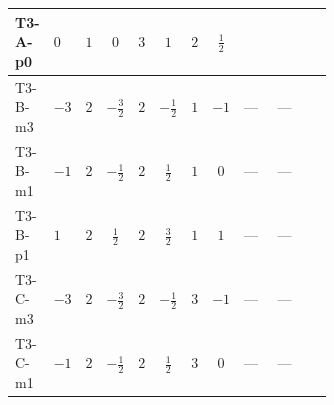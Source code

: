 \documentclass[8pt]{article}
\begin{document}
\begin{landscape}
\begin{longtable}{@{}llcccccc >{\raggedright\arraybackslash}p{0.21\linewidth} >{\raggedright\arraybackslash}p{0.21\linewidth} >{\raggedright\arraybackslash}p{0.21\linewidth}@{}}
\midrule
T3-A-p0 & $0$ & $1$ & $0$ & $3$ & $1$ & $2$ & $\frac{1}{2}$ & \scriptsize\adjustbox{max width=\linewidth}{$\begin{gathered} {\lambda_{S_2}^{(1)}} (4 T_{\nu}^{(2)}+14 {\lambda_{S_2}^{(A)}})\end{gathered}$} & \scriptsize\adjustbox{max width=\linewidth}{$\begin{gathered} +2 {\lambda_{S_2}^{(A)}} T_{\nu}^{(2)}\end{gathered}$} & \scriptsize\adjustbox{max width=\linewidth}{$\begin{gathered} -3 \operatorname{Tr}\!\left({y_2}\,\left({y_2}\right)^{\dagger}\,{y_2}\,\left({y_2}\right)^{\dagger}\right)\end{gathered}$} \\
\midrule
T3-B-m3 & $-3$ & $2$ & $-\frac{3}{2}$ & $2$ & $-\frac{1}{2}$ & $1$ & $-1$ & --- & --- & \scriptsize\adjustbox{max width=\linewidth}{$\begin{gathered} -4 \operatorname{Tr}\!\left({y_2}\,\left({y_2}\right)^{\dagger}\,{y_2}\,\left({y_2}\right)^{\dagger}\right)\end{gathered}$} \\
\midrule
T3-B-m1 & $-1$ & $2$ & $-\frac{1}{2}$ & $2$ & $\frac{1}{2}$ & $1$ & $0$ & --- & --- & \scriptsize\adjustbox{max width=\linewidth}{$\begin{gathered} -4 \operatorname{Tr}\!\left({y_2}\,\left({y_2}\right)^{\dagger}\,{y_2}\,\left({y_2}\right)^{\dagger}\right)\end{gathered}$} \\
\midrule
T3-B-p1 & $1$ & $2$ & $\frac{1}{2}$ & $2$ & $\frac{3}{2}$ & $1$ & $1$ & --- & --- & \scriptsize\adjustbox{max width=\linewidth}{$\begin{gathered} -4 \operatorname{Tr}\!\left({y_2}\,\left({y_2}\right)^{\dagger}\,{y_2}\,\left({y_2}\right)^{\dagger}\right)\end{gathered}$} \\
\midrule
T3-C-m3 & $-3$ & $2$ & $-\frac{3}{2}$ & $2$ & $-\frac{1}{2}$ & $3$ & $-1$ & --- & --- & \scriptsize\adjustbox{max width=\linewidth}{$\begin{gathered} -5 \operatorname{Tr}\!\left({y_2}\,\left({y_2}\right)^{\dagger}\,{y_2}\,\left({y_2}\right)^{\dagger}\right)\end{gathered}$} \\
\midrule
T3-C-m1 & $-1$ & $2$ & $-\frac{1}{2}$ & $2$ & $\frac{1}{2}$ & $3$ & $0$ & --- & --- & \scriptsize\adjustbox{max width=\linewidth}{$\begin{gathered} -5 \operatorname{Tr}\!\left({y_2}\,\left({y_2}\right)^{\dagger}\,{y_2}\,\left({y_2}\right)^{\dagger}\right)\end{gathered}$} \\

\end{longtable}
\end{landscape}
\end{document}

